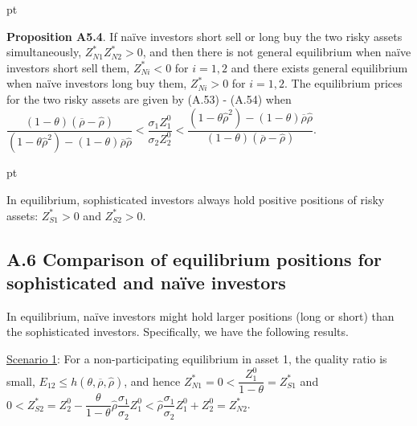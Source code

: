 \documentclass[10pt]{article}
\begin{document}
 pt

{\bf Proposition A5.4}. If na\"ive investors short sell or long buy the two risky assets simultaneously, $ Z_{N 1}^* Z_{N 2}^* > 0 $, and then there is not general equilibrium when na\"ive investors short sell them, $ Z_{N i}^* < 0 $ for $ i = 1, 2 $ and there exists general equilibrium when na\"ive investors long buy them, $ Z_{N i}^* > 0 $ for $ i = 1, 2 $. The equilibrium prices for the two risky assets are given by (A.53) - (A.54) when $ \dfrac{(1 - \theta) (\overline{\rho} - {\hat \rho})}{(1 - \theta {\hat \rho}^2) - (1 - \theta) \overline{\rho} {\hat \rho}} < \dfrac{\sigma_1 Z_1^0}{\sigma_2 Z_2^0} < \dfrac{(1 - \theta {\hat \rho}^2) - (1 - \theta) \overline{\rho} {\hat \rho}}{(1 - \theta) (\overline{\rho} - {\hat \rho})} $.

 pt

In equilibrium, sophisticated investors always hold positive positions of risky assets: $ Z_{S 1}^* > 0 $ and $ Z_{S 2}^* > 0 $. 

\subsection*{A.6 \quad Comparison of equilibrium positions for sophisticated and na\"ive investors}

\quad
In equilibrium, na\"ive investors might hold larger positions (long or short) than the sophisticated investors. Specifically, we have the following results.

\underline{Scenario 1}: For a non-participating equilibrium in asset 1, the quality ratio is small, $ E_{1 2} \leqslant h (\theta, \overline{\rho}, {\hat \rho}) $, and hence $ Z_{N 1}^* = 0 < \dfrac{Z_1^0}{1 - \theta} = Z_{S 1}^* $ and $ 0 < Z_{S 2}^* = Z_2^0 - \dfrac{\theta}{1 - \theta} {\hat \rho} \dfrac{\sigma_1}{\sigma_2} Z_1^0 < {\hat \rho} \dfrac{\sigma_1}{\sigma_2} Z_1^0 + Z_2^0 = Z_{N 2}^* $.
\end{document}
